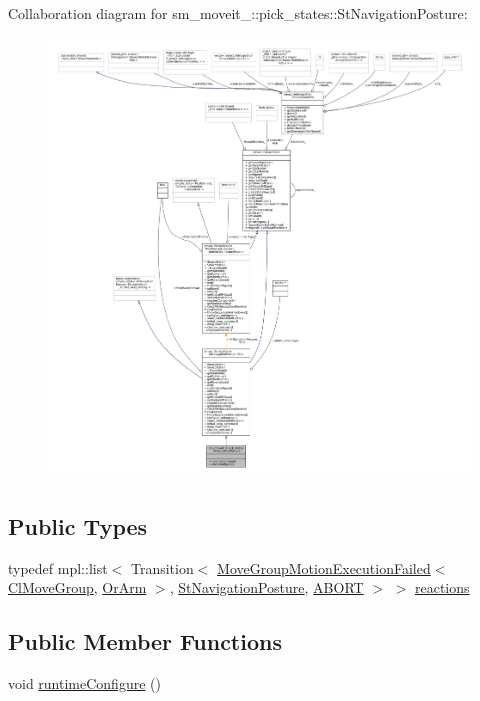 Collaboration diagram for sm\+\_\+moveit\+\_\+:\+:pick\+\_\+states\+:\+:St\+Navigation\+Posture\+:
\nopagebreak
\begin{figure}[H]
\begin{center}
\leavevmode
\includegraphics[width=350pt]{structsm__moveit__3_1_1pick__states_1_1StNavigationPosture__coll__graph}
\end{center}
\end{figure}
\subsection*{Public Types}
\begin{DoxyCompactItemize}
\item 
typedef mpl\+::list$<$ Transition$<$ \hyperlink{structmoveit__z__client_1_1MoveGroupMotionExecutionFailed}{Move\+Group\+Motion\+Execution\+Failed}$<$ \hyperlink{classmoveit__z__client_1_1ClMoveGroup}{Cl\+Move\+Group}, \hyperlink{classsm__moveit__3_1_1OrArm}{Or\+Arm} $>$, \hyperlink{structsm__moveit__3_1_1pick__states_1_1StNavigationPosture}{St\+Navigation\+Posture}, \hyperlink{classABORT}{A\+B\+O\+RT} $>$ $>$ \hyperlink{structsm__moveit__3_1_1pick__states_1_1StNavigationPosture_a3c5e70c830425941d23a5cc2f3bfde63}{reactions}
\end{DoxyCompactItemize}
\subsection*{Public Member Functions}
\begin{DoxyCompactItemize}
\item 
void \hyperlink{structsm__moveit__3_1_1pick__states_1_1StNavigationPosture_ac5647836bb2596454c7bb660106fc5f0}{runtime\+Configure} ()
\end{DoxyCompactItemize}
